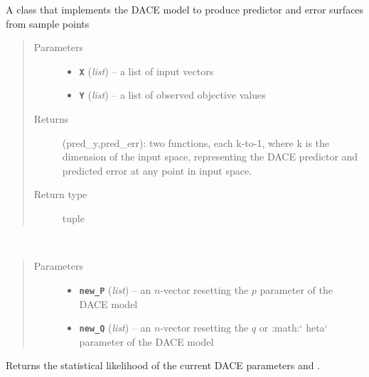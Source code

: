 \begin{fulllineitems}
\label{index:smbo.models.dace}
A class that implements the DACE model to produce predictor and error surfaces from sample points
\begin{quote}\begin{description}
\item[{Parameters}] \leavevmode\begin{itemize}
\item {} 
\textbf{\texttt{X}} (\emph{list}) -- a list of input vectors

\item {} 
\textbf{\texttt{Y}} (\emph{list}) -- a list of observed objective values

\end{itemize}

\item[{Returns}] \leavevmode
(pred\_y,pred\_err): two functions, each k-to-1, where k is the dimension of the input space, representing the DACE predictor and predicted error at any point in input space.

\item[{Return type}] \leavevmode
tuple

\end{description}\end{quote}

\begin{fulllineitems}
\label{index:smbo.models.dace.conc_likelihood}~\begin{quote}\begin{description}
\item[{Parameters}] \leavevmode\begin{itemize}
\item {} 
\textbf{\texttt{new\_P}} (\emph{list}) -- an \(n\)-vector resetting the \(p\) parameter of the DACE model

\item {} 
\textbf{\texttt{new\_Q}} (\emph{list}) -- an \(n\)-vector resetting the \(q\) or :math:{}`        heta{}` parameter of the DACE model

\end{itemize}

\end{description}\end{quote}

Returns the statistical likelihood of the current DACE parameters  and .

\end{fulllineitems}
\end{fulllineitems}

